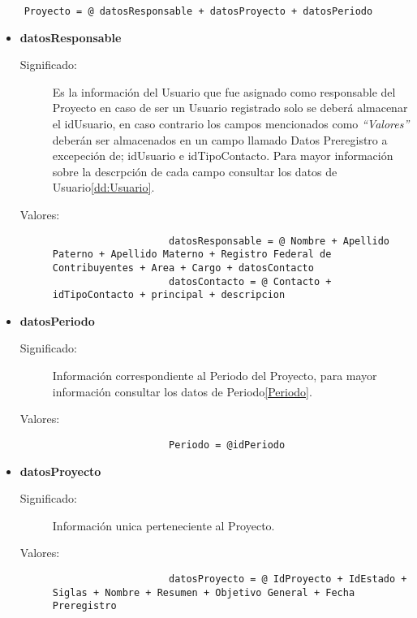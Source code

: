 \begin{lstlisting}
	Proyecto = @ datosResponsable + datosProyecto + datosPeriodo
\end{lstlisting}
\begin{itemize}
	\item	\textbf{datosResponsable}\label{datosResponsable}
		\begin{description}
			\item[Significado:]Es la información del Usuario que fue asignado como responsable del Proyecto en caso de ser un Usuario registrado solo se deberá almacenar el idUsuario, en caso contrario los campos mencionados como \textit{``Valores''} deberán ser almacenados en un campo llamado Datos Preregistro a excepeción de; idUsuario e idTipoContacto. Para mayor información sobre la descrpción de cada campo consultar los datos de Usuario\ref{dd:Usuario}.
			\item[Valores:]{\begin{lstlisting}
					datosResponsable = @ Nombre + Apellido Paterno + Apellido Materno + Registro Federal de Contribuyentes + Area + Cargo + datosContacto
					datosContacto = @ Contacto + idTipoContacto + principal + descripcion
				\end{lstlisting}}
		\end{description}

	\item	\textbf{datosPeriodo}
		\begin{description}
			\item[Significado:]Información correspondiente al Periodo del Proyecto, para mayor información consultar los datos de Periodo\ref{Periodo}.
			\item[Valores:]{\begin{lstlisting}
					Periodo = @idPeriodo 
				\end{lstlisting}}
		\end{description}

	\item	\textbf{datosProyecto}
		\begin{description}
			\item[Significado:]Información unica perteneciente al Proyecto.
			\item[Valores:]{\begin{lstlisting}
					datosProyecto = @ IdProyecto + IdEstado + Siglas + Nombre + Resumen + Objetivo General + Fecha Preregistro
				\end{lstlisting}}
		\end{description}


\end{itemize}
